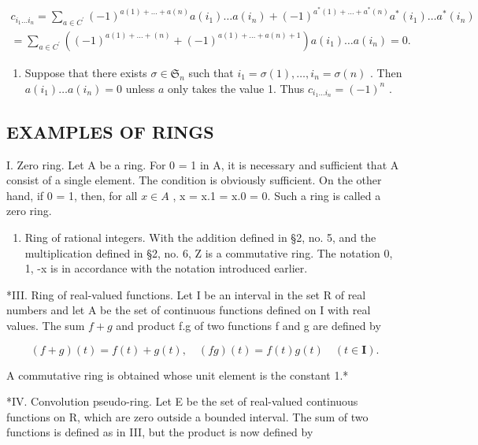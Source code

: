 \[
\begin{array}{l} c _ {i _ {1} \dots i _ {n}} = \sum_ {a \in C ^ {\prime}} (- 1) ^ {a (1) + \dots + a (n)} a (i _ {1}) \dots a (i _ {n}) + (- 1) ^ {a ^ {*} (1) + \dots + a ^ {*} (n)} a ^ {*} (i _ {1}) \dots a ^ {*} (i _ {n}) \\ = \sum_ {a \in C ^ {\prime}} ((- 1) ^ {a (1) + \dots + (n)} + (- 1) ^ {a (1) + \dots + a (n) + 1}) a (i _ {1}) \dots a (i _ {n}) = 0. \end{array}
\]

\begin{enumerate}
\def\labelenumi{(\arabic{enumi})}
\setcounter{enumi}{1}
\tightlist
\item
  Suppose that there exists \(\sigma \in \mathfrak{S}_n\) such that \(i_1 = \sigma(1), \ldots, i_n = \sigma(n)\) . Then \(a(i_1) \ldots a(i_n) = 0\) unless \(a\) only takes the value 1. Thus \(c_{i_1 \ldots i_n} = (-1)^n\) .
\end{enumerate}

\subsection{EXAMPLES OF RINGS}

I. Zero ring. Let A be a ring. For 0 = 1 in A, it is necessary and sufficient that A consist of a single element. The condition is obviously sufficient. On the other hand, if 0 = 1, then, for all \(x \in A\) , x = x.1 = x.0 = 0. Such a ring is called a zero ring.

\begin{enumerate}
\def\labelenumi{\Roman{enumi}.}
\setcounter{enumi}{1}
\tightlist
\item
  Ring of rational integers. With the addition defined in §2, no. 5, and the multiplication defined in §2, no. 6, Z is a commutative ring. The notation 0, 1, -x is in accordance with the notation introduced earlier.
\end{enumerate}

*III. Ring of real-valued functions. Let I be an interval in the set R of real numbers and let A be the set of continuous functions defined on I with real values. The sum \(f + g\) and product f.g of two functions f and g are defined by

\[
(f + g) (t) = f (t) + g (t), \quad (f g) (t) = f (t) g (t) \quad (t \in \mathbf {I}).
\]

A commutative ring is obtained whose unit element is the constant 1.*

*IV. Convolution pseudo-ring. Let E be the set of real-valued continuous functions on R, which are zero outside a bounded interval. The sum of two functions is defined as in III, but the product is now defined by

